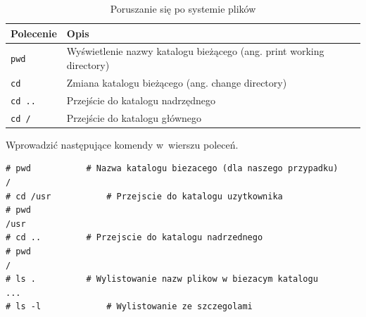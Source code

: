 \begin{example}
\begin{example}
\begin{table}[h!]
\centering
\caption{Poruszanie się po systemie plików}
\setlength{\arrayrulewidth}{1pt}
\setlength{\tabcolsep}{6pt}
\renewcommand{\arraystretch}{1.2}
\begin{tabular}{ |p{}|p{}|}
\hline \rowcolor{gray}
\textbf{Polecenie} & \textbf{Opis} \\ \hline
\mbox{\lstinline[style=MyBashStyle]{pwd}} & Wyświetlenie nazwy katalogu bieżącego (ang. print working directory) \\ \hline
\mbox{\lstinline[style=MyBashStyle]{cd}}  & Zmiana katalogu bieżącego (ang. change directory) \\ \hline
\mbox{\lstinline[style=MyBashStyle]{cd ..}} & Przejście do katalogu nadrzędnego \\ \hline
\mbox{\lstinline[style=MyBashStyle]{cd /}} & Przejście do katalogu głównego \\ \hline
\end{tabular}
\label{tab:poruszanie}
\end{table}
\end{example}



Wprowadzić następujące komendy w~wierszu poleceń.

\begin{lstlisting}[style=MyBashStyle]
# pwd			# Nazwa katalogu biezacego (dla naszego przypadku)
/
# cd /usr			# Przejscie do katalogu uzytkownika
# pwd
/usr
# cd ..			# Przejscie do katalogu nadrzednego
# pwd
/
# ls .			# Wylistowanie nazw plikow w biezacym katalogu
...
# ls -l 			# Wylistowanie ze szczegolami
\end{lstlisting}
\end{example}

